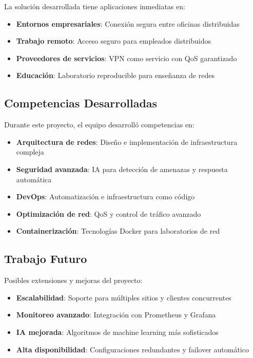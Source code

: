 La solución desarrollada tiene aplicaciones inmediatas en:

\begin{itemize}
    \item \textbf{Entornos empresariales}: Conexión segura entre oficinas distribuidas
    \item \textbf{Trabajo remoto}: Acceso seguro para empleados distribuidos
    \item \textbf{Proveedores de servicios}: VPN como servicio con QoS garantizado
    \item \textbf{Educación}: Laboratorio reproducible para enseñanza de redes
\end{itemize}

\subsection{Competencias Desarrolladas}

Durante este proyecto, el equipo desarrolló competencias en:

\begin{itemize}
    \item \textbf{Arquitectura de redes}: Diseño e implementación de infraestructura compleja
    \item \textbf{Seguridad avanzada}: IA para detección de amenazas y respuesta automática
    \item \textbf{DevOps}: Automatización e infraestructura como código
    \item \textbf{Optimización de red}: QoS y control de tráfico avanzado
    \item \textbf{Containerización}: Tecnologías Docker para laboratorios de red
\end{itemize}

\subsection{Trabajo Futuro}

Posibles extensiones y mejoras del proyecto:

\begin{itemize}
    \item \textbf{Escalabilidad}: Soporte para múltiples sitios y clientes concurrentes
    \item \textbf{Monitoreo avanzado}: Integración con Prometheus y Grafana
    \item \textbf{IA mejorada}: Algoritmos de machine learning más sofisticados
    \item \textbf{Alta disponibilidad}: Configuraciones redundantes y failover automático
\end{itemize}
